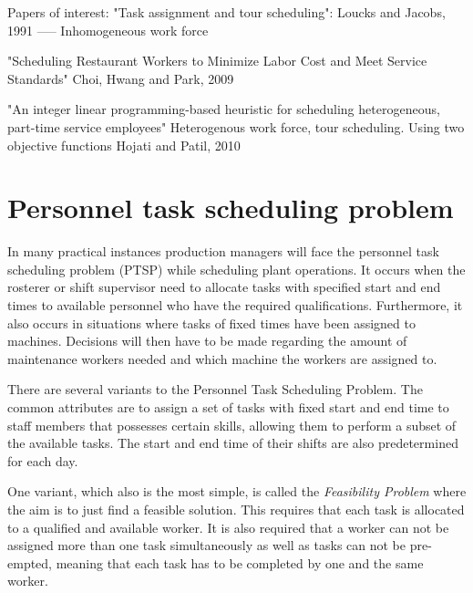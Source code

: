 Papers of interest:
"Task assignment and tour scheduling": Loucks and Jacobs, 1991
----- Inhomogeneous work force

"Scheduling Restaurant Workers to Minimize Labor Cost and Meet Service Standards" Choi, Hwang and Park, 2009

"An integer linear programming-based heuristic for scheduling heterogeneous, part-time service employees" Heterogenous work force, tour scheduling. Using two objective functions Hojati and Patil, 2010


\section{Personnel task scheduling problem} \label{PTSP}
In many practical instances production managers will face the personnel task scheduling problem (PTSP) while scheduling plant operations. It occurs when the rosterer or shift supervisor need to allocate tasks with specified start and end times to available personnel who have the required qualifications. Furthermore, it also occurs in situations where tasks of fixed times have been assigned to machines. Decisions will then have to be made regarding the amount of maintenance workers needed and which machine the workers are assigned to.

There are several variants to the Personnel Task Scheduling Problem. The common attributes are to assign a set of tasks with fixed start and end time to staff members that possesses certain skills, allowing them to perform a subset of the available tasks. The start and end time of their shifts are also predetermined for each day.

One variant, which also is the most simple, is called the \textit{Feasibility Problem} where the aim is to just find a feasible solution. This requires that each task is allocated to a qualified and available worker. It is also required that a worker can not be assigned more than one task simultaneously as well as tasks can not be pre-empted, meaning that each task has to be completed by one and the same worker.

